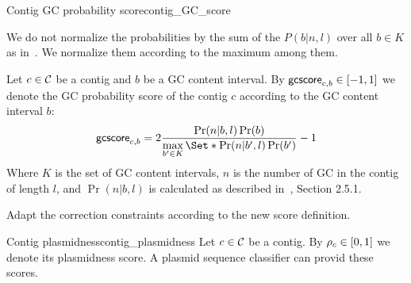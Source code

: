 \begin{definition}{Contig GC probability score}{contig_GC_score}
  \begin{newfeatbox}
    We do not normalize the probabilities by the sum of the \(P(b|n,l)\) over all \(b \in K\) as in~\cite{manePlasBinflowFlowbasedMILP2023}. We normalize them according to the maximum among them.
  \end{newfeatbox}
  Let \(c \in \mathcal{C}{}\) be a contig and \(b\) be a GC content interval.
  By \(\mathsf{gcscore}_{c, b} \in [-1, 1]\) we denote the GC probability score of the contig \(c\) according to the GC content interval \(b\):
  \[
    \gcscore{c}{b} = 2 \frac{\Pr(n|b,l)\Pr(b)}{\max\limits_{b' \in K}\Set*{\Pr(n|b',l)\Pr(b')}} - 1
  \]
  Where \(K\) is the set of GC content intervals, \(n\) is the number of GC in the contig of length \(l\), and \(\Pr(n|b,l)\) is calculated as described in~\cite{manePlasBinflowFlowbasedMILP2023}, Section 2.5.1.

  \begin{fixmebox}
    Adapt the correction constraints according to the new score definition.
  \end{fixmebox}
\end{definition}

\begin{definition}{Contig plasmidness}{contig_plasmidness}
  Let \(c \in \mathcal{C}{}\) be a contig.
  By \(\rho_{c} \in [0, 1]\) we denote its plasmidness score.
  A plasmid sequence classifier can provid these scores.
\end{definition}